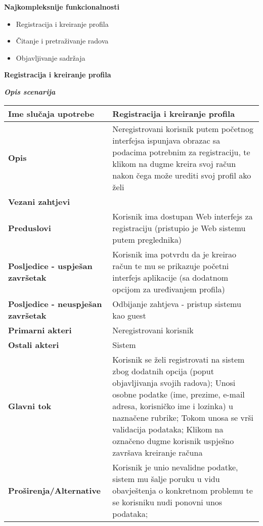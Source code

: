 \documentclass[12pt, a4paper]{report}
\begin{document}
\begin{flushleft}
{\large \textbf{Najkompleksnije funkcionalnosti}
\begin{itemize}
    \item Registracija i kreiranje profila
    \item Čitanje i pretraživanje radova
    \item Objavljivanje sadržaja \newline
\end{itemize} \newpage

\textbf{Registracija i kreiranje profila}}  \newline

\textbf{\textit{Opis scenarija}} \\
\begin{tabular}{|m{7cm}|m{7cm}|} 
 \hline
 \textbf{Ime slučaja upotrebe} & Registracija i kreiranje profila \\ 
 \hline
 \textbf{Opis} & Neregistrovani korisnik putem početnog interfejsa ispunjava obrazac sa podacima potrebnim za registraciju, te klikom na dugme kreira svoj račun nakon čega može urediti svoj profil ako želi\\ 
 \hline
 \textbf{Vezani zahtjevi} &  \\ 
 \hline
 \textbf{Preduslovi} & Korisnik ima dostupan Web interfejs za registraciju (pristupio je Web sistemu putem preglednika) \\ 
 \hline
 \textbf{Posljedice - uspješan završetak} & Korisnik ima potvrdu da je kreirao račun te mu se prikazuje početni interfejs aplikacije (sa dodatnom opcijom za uređivanjem profila) \\ 
 \hline
 \textbf{Posljedice - neuspješan završetak} & Odbijanje zahtjeva - pristup sistemu kao guest \\ 
 \hline
 \textbf{Primarni akteri} & Neregistrovani korisnik \\ 
 \hline
 \textbf{Ostali akteri} & Sistem \\ 
 \hline
 \textbf{Glavni tok} & Korisnik se želi registrovati na sistem zbog dodatnih opcija (poput objavljivanja svojih radova); Unosi osobne podatke (ime, prezime, e-mail adresa, korisničko ime i lozinka) u naznačene rubrike; Tokom unosa se vrši validacija podataka; Klikom na označeno dugme korisnik uspješno završava kreiranje računa  \\ 
 \hline
 \textbf{Proširenja/Alternative} & Korisnik je unio nevalidne podatke, sistem mu šalje poruku u vidu obavještenja o konkretnom problemu te se korisniku nudi ponovni unos podataka; \\ 
 \hline
\end{tabular} \newpage


\end{flushleft}
\end{document}
